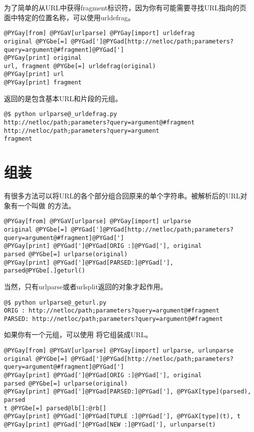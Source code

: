 \documentclass[a4paper,10pt,english]{manual}
\begin{document}
为了简单的从URL中获得fragment标识符，因为你有可能需要寻找URL指向的页面中特定的位置名称，可以使用urldefrag。

\begin{Verbatim}[commandchars=@\[\]]
@PYGay[from] @PYGaV[urlparse] @PYGay[import] urldefrag
original @PYGbe[=] @PYGad[']@PYGad[http://netloc/path;parameters?query=argument@#fragment]@PYGad[']
@PYGay[print] original
url, fragment @PYGbe[=] urldefrag(original)
@PYGay[print] url
@PYGay[print] fragment
\end{Verbatim}

返回的是包含基本URL和片段的元组。

\begin{Verbatim}[commandchars=@\[\]]
@$ python urlparse@_urldefrag.py
http://netloc/path;parameters?query=argument@#fragment
http://netloc/path;parameters?query=argument
fragment
\end{Verbatim}


\section{组装}

有很多方法可以将URL的各个部分组合回原来的单个字符串。被解析后的URL对象有一个叫做  的方法。

\begin{Verbatim}[commandchars=@\[\]]
@PYGay[from] @PYGaV[urlparse] @PYGay[import] urlparse
original @PYGbe[=] @PYGad[']@PYGad[http://netloc/path;parameters?query=argument@#fragment]@PYGad[']
@PYGay[print] @PYGad[']@PYGad[ORIG :]@PYGad['], original
parsed @PYGbe[=] urlparse(original)
@PYGay[print] @PYGad[']@PYGad[PARSED:]@PYGad['], parsed@PYGbe[.]geturl()
\end{Verbatim}

当然，只有urlparse或者urlsplit返回的对象才起作用。

\begin{Verbatim}[commandchars=@\[\]]
@$ python urlparse@_geturl.py
ORIG : http://netloc/path;parameters?query=argument@#fragment
PARSED: http://netloc/path;parameters?query=argument@#fragment
\end{Verbatim}

如果你有一个元组，可以使用  将它组装成URL。

\begin{Verbatim}[commandchars=@\[\]]
@PYGay[from] @PYGaV[urlparse] @PYGay[import] urlparse, urlunparse
original @PYGbe[=] @PYGad[']@PYGad[http://netloc/path;parameters?query=argument@#fragment]@PYGad[']
@PYGay[print] @PYGad[']@PYGad[ORIG :]@PYGad['], original
parsed @PYGbe[=] urlparse(original)
@PYGay[print] @PYGad[']@PYGad[PARSED:]@PYGad['], @PYGaX[type](parsed), parsed
t @PYGbe[=] parsed@lb[]:@rb[]
@PYGay[print] @PYGad[']@PYGad[TUPLE :]@PYGad['], @PYGaX[type](t), t
@PYGay[print] @PYGad[']@PYGad[NEW :]@PYGad['], urlunparse(t)
\end{Verbatim}
\end{document}
